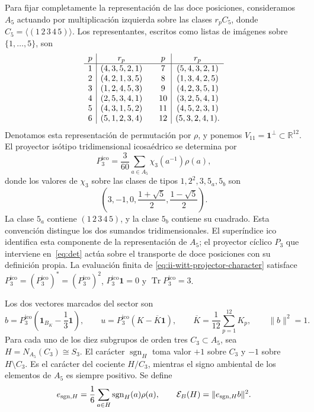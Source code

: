 Para fijar completamente la representación de las doce posiciones,
consideramos \(A_5\) actuando por multiplicación izquierda sobre las
clases \(r_pC_5\), donde \(C_5=\langle(1\,2\,3\,4\,5)\rangle\).
Los representantes, escritos como listas de imágenes sobre
\(\{1,\ldots,5\}\), son
\[
\begin{array}{c|c@{\qquad}c|c}
p&r_p&p&r_p\\ \hline
1&(4,3,5,2,1)&7&(5,4,3,2,1)\\
2&(4,2,1,3,5)&8&(1,3,4,2,5)\\
3&(1,2,4,5,3)&9&(4,2,3,5,1)\\
4&(2,5,3,4,1)&10&(3,2,5,4,1)\\
5&(4,3,1,5,2)&11&(4,5,2,3,1)\\
6&(5,1,2,3,4)&12&(5,3,2,4,1).
\end{array}
\]
Denotamos esta representación de permutación por \(\rho\), y ponemos
\(V_{11}=\mathbf1^\perp\subset\mathbb R^{12}\). El proyector
isótipo tridimensional icosaédrico se determina por
\begin{equation}
 P_3^{\mathrm{ico}}=\frac3{60}\sum_{a\in A_5}\chi_3(a^{-1})\rho(a),
 \label{eq:ii-witt-projector-character}
\end{equation}
donde los valores de \(\chi_3\) sobre las clases de tipos
\(1,2^2,3,5_a,5_b\) son
\[
 \left(3,-1,0,\frac{1+\sqrt5}{2},\frac{1-\sqrt5}{2}\right).
\]
La clase \(5_a\) contiene \((1\,2\,3\,4\,5)\), y la clase
\(5_b\) contiene su cuadrado. Esta convención distingue los dos
sumandos tridimensionales. El superíndice \(\mathrm{ico}\) identifica
esta componente de la representación de \(A_5\); el proyector cíclico
\(P_3\) que interviene en~\eqref{eq:det} actúa sobre el transporte de doce
posiciones con su definición propia. La evaluación finita de
\eqref{eq:ii-witt-projector-character} satisface
\(P_3^{\mathrm{ico}}=(P_3^{\mathrm{ico}})^*=(P_3^{\mathrm{ico}})^2\), \(P_3^{\mathrm{ico}}\mathbf1=0\) y
\(\operatorname{Tr}P_3^{\mathrm{ico}}=3\).

Los dos vectores marcados del sector son
\[
 b=P_3^{\mathrm{ico}}\left(\mathbf1_{B_K}-\frac13\mathbf1\right),
 \qquad u=P_3^{\mathrm{ico}}(K-\overline K\mathbf1),
 \qquad \overline K=\frac1{12}\sum_{p=1}^{12}K_p,
 \qquad \|b\|^2=1.
\]
Para cada uno de los diez subgrupos de orden tres \(C_3\subset A_5\),
sea \(H=N_{A_5}(C_3)\cong S_3\). El carácter
\(\operatorname{sgn}_H\) toma valor \(+1\) sobre \(C_3\) y
\(-1\) sobre \(H\setminus C_3\). Es el carácter del cociente
\(H/C_3\), mientras el signo ambiental de los elementos de \(A_5\)
es siempre positivo. Se define
\begin{equation}
 e_{{\rm sgn},H}=\frac16\sum_{a\in H}\operatorname{sgn}_H(a)\rho(a),
 \qquad \mathcal E_B(H)=\|e_{{\rm sgn},H}b\|^2.
 \label{eq:ii-witt-energy}
\end{equation}

